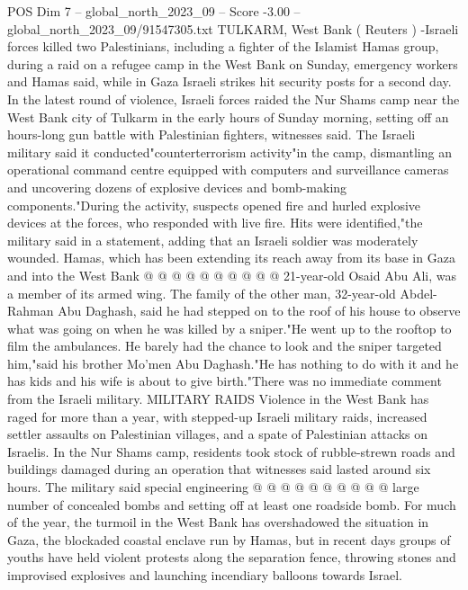 \begin{textsample}{POS Dim 7 – global\_north\_2023\_09 – Score -3.00 – global\_north\_2023\_09/91547305.txt}  \label{ex:f7_pos_289}
TULKARM, West Bank ( Reuters ) -Israeli forces killed two Palestinians, including a fighter of the Islamist Hamas group, during a raid on a refugee camp in the West Bank on Sunday, emergency workers and Hamas said, while in Gaza Israeli strikes hit security posts for a second day.
In the latest round of violence, Israeli forces raided the Nur Shams camp near the West Bank city of Tulkarm in the early hours of Sunday morning, setting off an hours-long gun battle with Palestinian fighters, witnesses said.
The Israeli military said it conducted"counterterrorism activity"in the camp, dismantling an operational command centre equipped with computers and surveillance cameras and uncovering dozens of explosive devices and bomb-making components."During the activity, suspects opened fire and hurled explosive devices at the forces, who responded with live fire.
Hits were identified,"the military said in a statement, adding that an Israeli soldier was moderately wounded.
Hamas, which has been extending its reach away from its base in Gaza and into the West Bank @ @ @ @ @ @ @ @ @ @ 21-year-old Osaid Abu Ali, was a member of its armed wing.
The family of the other man, 32-year-old Abdel-Rahman Abu Daghash, said he had stepped on to the roof of his house to observe what was going on when he was killed by a sniper."He went up to the rooftop to film the ambulances.
He barely had the chance to look and the sniper targeted him,"said his brother Mo'men Abu Daghash."He has nothing to do with it and he has kids and his wife is about to give birth."There was no immediate comment from the Israeli military.
MILITARY RAIDS Violence in the West Bank has raged for more than a year, with stepped-up Israeli military raids, increased settler assaults on Palestinian villages, and a spate of Palestinian attacks on Israelis.
In the Nur Shams camp, residents took stock of rubble-strewn roads and buildings damaged during an operation that witnesses said lasted around six hours.
The military said special engineering @ @ @ @ @ @ @ @ @ @ large number of concealed bombs and setting off at least one roadside bomb.
For much of the year, the turmoil in the West Bank has overshadowed the situation in Gaza, the blockaded coastal enclave run by Hamas, but in recent days groups of youths have held violent protests along the separation fence, throwing stones and improvised explosives and launching incendiary balloons towards Israel.

\end{textsample}
